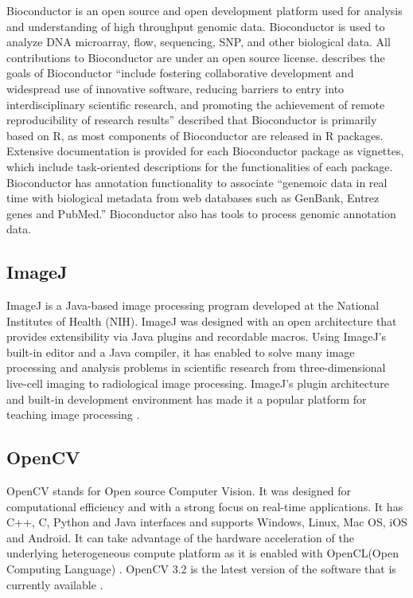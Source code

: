     Bioconductor is an open source and open development platform used
    for analysis and understanding of high throughput genomic
    data. Bioconductor is used to analyze DNA microarray, flow,
    sequencing, SNP, and other biological data. All contributions to
    Bioconductor are under an open source
    license. \cite{bioconductor-article-2004} describes the goals of
    Bioconductor ``include fostering collaborative development and
    widespread use of innovative software, reducing barriers to entry
    into interdisciplinary scientific research, and promoting the
    achievement of remote reproducibility of research results''
    \cite{www-bioconductor-about} described that Bioconductor is
    primarily based on R, as most components of Bioconductor are
    released in R packages. Extensive documentation is provided for
    each Bioconductor package as vignettes, which include
    task-oriented descriptions for the functionalities of each
    package. Bioconductor has annotation functionality to associate
    ``genemoic data in real time with biological metadata from web
    databases such as GenBank, Entrez genes and PubMed.''  Bioconductor
    also has tools to process genomic annotation data.
    
\subsection{ImageJ}

    ImageJ is a Java-based image processing program developed at the
    National Institutes of Health (NIH). ImageJ was designed with an
    open architecture that provides extensibility via Java plugins and
    recordable macros.  Using ImageJ's built-in editor and a Java
    compiler, it has enabled to solve many image processing and
    analysis problems in scientific research from three-dimensional
    live-cell imaging to radiological image processing.  ImageJ's
    plugin architecture and built-in development environment has made
    it a popular platform for teaching image
    processing \cite{www-imagej}.

\subsection{OpenCV}

    OpenCV stands for Open source Computer Vision. It was designed for
    computational efficiency and with a strong focus on real-time
    applications. It has C++, C, Python and Java interfaces and
    supports Windows, Linux, Mac OS, iOS and Android. It can take
    advantage of the hardware acceleration of the underlying
    heterogeneous compute platform as it is enabled with OpenCL(Open
    Computing Language) \cite{www-opencv}. OpenCV 3.2 is the latest
    version of the software that is currently available
    \cite{opencv-version}.

